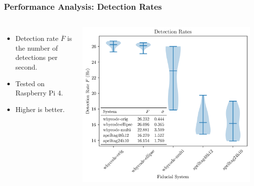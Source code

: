 \documentclass[aspectratio=169]{rubeamer}
\begin{document}
\begin{frame}
  \frametitle{Performance Analysis: Detection Rates}
  \begin{columns}
      \centering
      \begin{itemize}
        \item Detection rate $\overline{F}$ is the number of detections per second.
        \item Tested on Raspberry Pi 4.
        \item Higher is better.
      \end{itemize}
      \centering
      \includegraphics[width=\textwidth]{violin_plot_speed_five_member}
  \end{columns}
\end{frame}
\end{document}
